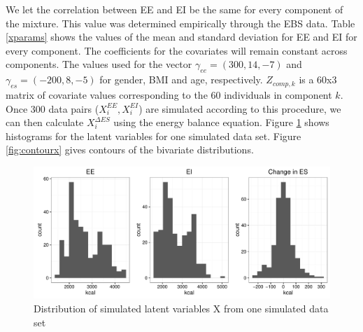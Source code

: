 \documentclass[11pt]{article}\usepackage[]{graphicx}\usepackage[]{color}
\makeatletter
\def\maxwidth{ %
  \ifdim\Gin@nat@width>\linewidth
    \linewidth
  \else
    \Gin@nat@width
  \fi
}
\newenvironment{knitrout}{}{} %
\makeatother
\begin{document}

We let the correlation between EE and EI be the same for every component of the mixture. This value was determined empirically through the EBS data. Table \eqref{xparams} shows the values of the mean and standard deviation for EE and EI for every component. The coefficients for the covariates will remain constant across components. The values used for the vector $\gamma_{ee}=(300,14,-7)$ and $\gamma_{es}=(-200,8,-5)$ for gender, BMI and age, respectively. $Z_{comp,k}$ is a 60x3 matrix of covariate values corresponding to the 60 individuals in component $k$.  Once 300 data pairs ($X_i^{EE}, X_i^{EI}$) are simulated according to this procedure, we can then calculate  $X_i^{\Delta ES}$ using the energy balance equation. Figure \ref{fig:latentx} shows histograms for the latent variables for one simulated data set. Figure \ref{fig:contourx} gives contours of the bivariate distributions.


\begin{knitrout}
\color{fgcolor}\begin{figure}
\includegraphics[width=\maxwidth]{figure/latentx-1} \caption[Distribution of simulated latent variables X from one simulated data set]{Distribution of simulated latent variables X from one simulated data set}\label{fig:latentx}
\end{figure}


\end{knitrout}
\end{document}

